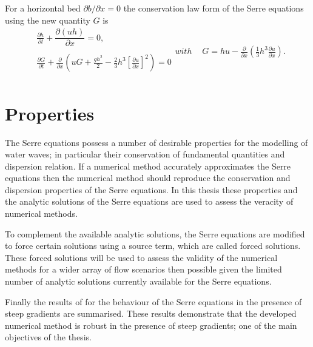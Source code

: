 For a horizontal bed $\partial b / \partial x = 0$ the conservation law form of the Serre equations using the new quantity $G$ is
\begin{subequations}
	\label{eqn:FullSerreConHorizBed}
	\begin{align}
	&\frac{\partial h}{\partial t} + \dfrac{\partial (uh)}{\partial x} = 0, \label{eqn:FullSerreConMassHorizBed} \\  \nonumber \\
	&\frac{\partial G}{\partial t}   + \frac{\partial}{\partial x} \left( {u} G + \frac{gh^2}{2} - \frac{2}{3}h^3 \left[\frac{\partial {u}}{\partial x}\right]^2 \right) = 0 \label{eqn:SerreconsconmomHorizBed}\\ \nonumber 
	\end{align}
	with
	\begin{align}
	&G =  h {u}  - \frac{\partial}{\partial x}\left(\frac{1}{3}h^3  \frac{\partial {u}}{\partial x}\right). \label{defn:SerreEqnConservedQuantity1HorizBed}
	\end{align}
\end{subequations}


\section{Properties}
The Serre equations possess a number of desirable properties for the modelling of water waves; in particular their conservation of fundamental quantities and dispersion relation. If a numerical method accurately approximates the Serre equations then the numerical method should reproduce the conservation and dispersion properties of the Serre equations. In this thesis these properties and the analytic solutions of the Serre equations are used to assess the veracity of numerical methods. 

To complement the available analytic solutions, the Serre equations are modified to force certain solutions using a source term, which are called forced solutions. These forced solutions will be used to assess the validity of the numerical methods for a wider array of flow scenarios then possible given the limited number of analytic solutions currently available for the Serre equations.

Finally the results of \citet{Pitt-2017-1725} for the behaviour of the Serre equations in the presence of steep gradients are summarised. These results demonstrate that the developed numerical method is robust in the presence of steep gradients; one of the main objectives of the thesis. 

